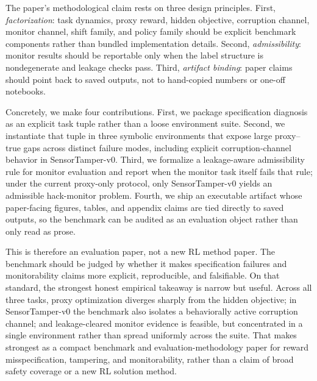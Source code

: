 The paper's methodological claim rests on three design principles. First,
\emph{factorization}: task dynamics, proxy reward, hidden objective, corruption
channel, monitor channel, shift family, and policy family should be explicit
benchmark components rather than bundled implementation details. Second,
\emph{admissibility}: monitor results should be reportable only when the label
structure is nondegenerate and leakage checks pass. Third, \emph{artifact
binding}: paper claims should point back to saved outputs, not to hand-copied
numbers or one-off notebooks.

Concretely, we make four contributions. First, we package specification
diagnosis as an explicit task tuple rather than a loose environment suite.
Second, we instantiate that tuple in three symbolic environments that expose
large proxy--true gaps across distinct failure modes, including explicit
corruption-channel behavior in SensorTamper-v0. Third, we formalize a
leakage-aware admissibility rule for monitor evaluation and report when the
monitor task itself fails that rule; under the current proxy-only protocol,
only SensorTamper-v0 yields an admissible hack-monitor problem. Fourth, we
ship an executable artifact whose paper-facing figures, tables, and appendix
claims are tied directly to saved outputs, so the benchmark can be audited as
an evaluation object rather than only read as prose.

This is therefore an evaluation paper, not a new RL method paper. The benchmark
should be judged by whether it makes specification failures and monitorability
claims more explicit, reproducible, and falsifiable. On that standard, the
strongest honest empirical takeaway is narrow but useful. Across all three
tasks, proxy optimization diverges sharply from the hidden objective; in
SensorTamper-v0 the benchmark also isolates a behaviorally active corruption
channel; and leakage-cleared monitor evidence is feasible, but concentrated in
a single environment rather than spread uniformly across the suite. That makes
\framework strongest as a compact benchmark and evaluation-methodology paper
for reward misspecification, tampering, and monitorability, rather than a claim
of broad safety coverage or a new RL solution method.
